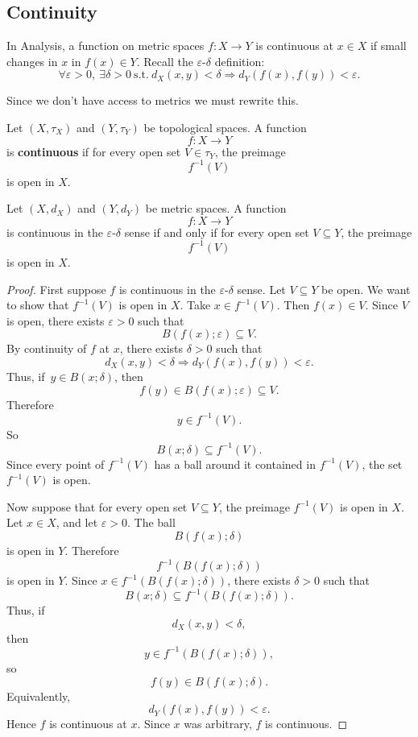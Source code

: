\subsection*{Continuity}
In Analysis, a function on metric spaces $f : X \to Y$ 
is continuous at $x\in X$ if small changes in $x$ in 
$f(x) \in Y$. Recall the $\varepsilon$-$\delta$ definition: 
\[
    \forall \varepsilon > 0, \ \exists \delta > 0 \ \text{s.t.} \ 
    d_X(x,y) < \delta \Rightarrow d_Y(f(x), f(y)) < \varepsilon.
\]

Since we don't have access to metrics we must rewrite this. 

\begin{defn}[Continuity]
    Let $(X,\tau_X)$ and $(Y,\tau_Y)$ be topological spaces. 
    A function 
    \[
        f : X \to Y
    \]
    is \textbf{continuous} if for every open set $V \in \tau_Y$, 
    the preimage 
    \[
        f^{-1}(V)
    \]
    is open in $X$. 
\end{defn}

\begin{prop}
    Let $(X,d_X)$ and $(Y,d_Y)$ be metric spaces. 
    A function 
    \[
        f : X \to Y
    \]
    is continuous in the $\varepsilon$-$\delta$ sense if 
    and only if for every open set $V \subseteq Y$, the 
    preimage 
    \[
        f^{-1}(V)
    \]
    is open in $X$.
\end{prop}
\begin{proof}
    First suppose $f$ is continuous in the $\varepsilon$-$\delta$ 
    sense. 
    Let $V \subseteq Y$ be open. We want to show that $f^{-1}(V)$ is 
    open in $X$. Take $x \in f^{-1}(V)$. Then 
    $f(x) \in V$. Since $V$ is open, there exists 
    $\varepsilon > 0$ such that 
    \[
        B(f(x) ; \varepsilon) \subseteq V. 
    \]
    By continuity of $f$ at $x$, there exists $\delta > 0$ such that 
    \[
        d_X(x,y) < \delta \Rightarrow d_Y(f(x),f(y)) < \varepsilon. 
    \]
    Thus, if $y \in B(x;\delta)$, then 
    \[
        f(y) \in B(f(x);\varepsilon) \subseteq V. 
    \]
    Therefore 
    \[
        y \in f^{-1}(V). 
    \]
    So 
    \[
        B(x;\delta) \subseteq f^{-1}(V). 
    \]
    Since every point of $f^{-1}(V)$ has a ball around it 
    contained in $f^{-1}(V)$, the set $f^{-1}(V)$ is open. 
    
    Now suppose that for every open set $V \subseteq Y$, the 
    preimage $f^{-1}(V)$ is open in $X$. 
    Let $x \in X$, and let $\varepsilon > 0$. The ball 
    \[
        B(f(x) ; \delta)
    \]
    is open in $Y$. Therefore 
    \[
        f^{-1}(B(f(x);\delta))
    \]
    is open in $Y$. 
    Since $x \in f^{-1}(B(f(x);\delta))$, there exists 
    $\delta > 0$ such that 
    \[
        B(x;\delta) \subseteq f^{-1}(B(f(x);\delta)). 
    \]
    Thus, if 
    \[
        d_X(x,y) < \delta, 
    \]
    then 
    \[
        y \in f^{-1}(B(f(x);\delta)), 
    \]
    so 
    \[
        f(y) \in B(f(x);\delta). 
    \]
    Equivalently, 
    \[
        d_Y(f(x),f(y)) < \varepsilon. 
    \]
    Hence $f$ is continuous at $x$. Since $x$ was arbitrary, 
    $f$ is continuous.
\end{proof}

